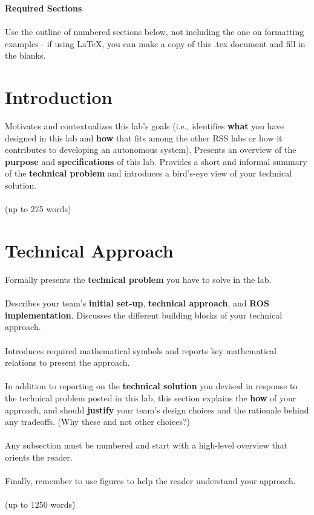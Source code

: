 \documentclass{article}
\begin{document}
\textbf{Required Sections}\\\\
Use the outline of numbered sections below, not including the one on formatting examples - if using LaTeX, you can make a copy of this .tex document and fill in the blanks.

\section{Introduction}
Motivates and contextualizes this lab’s goals (i.e., identifies \textbf{what} you have designed in this lab and \textbf{how} that fits among the other RSS labs or how it contributes to developing an autonomous system). Presents an overview of the \textbf{purpose} and \textbf{specifications} of this lab. Provides a short and informal summary of the \textbf{technical problem} and introduces a bird’s-eye view of your technical solution.\\\\
(up to 275 words)

\section{Technical Approach}
Formally presents the \textbf{technical problem} you have to solve in the lab.\\\\
Describes your team’s \textbf{initial set-up}, \textbf{technical approach}, and \textbf{ROS implementation}. Discusses the different building blocks of your technical approach.\\\\
Introduces required mathematical symbols and reports key mathematical relations to present the approach.\\\\
In addition to reporting on the \textbf{technical solution} you devised in response to the technical problem posted in this lab, this section explains the \textbf{how} of your approach, and should \textbf{justify} your team’s design choices and the rationale behind any tradeoffs. (Why these and not other choices?)\\\\
Any subsection must be numbered and start with a high-level overview that orients the reader.\\\\
Finally, remember to use figures to help the reader understand your approach.\\\\
(up to 1250 words)
\end{document}
